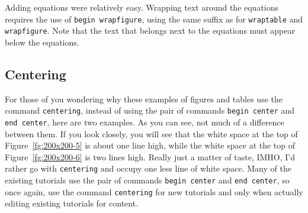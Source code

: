 Adding equations were relatively easy.  Wrapping text around the equations requires the use of \texttt{begin wrapfigure}, using the same suffix as for \texttt{wraptable} and \texttt{wrapfigure}.  Note that the text that belongs next to the equations must appear below the equations.\\

\subsection*{Centering}

For those of you wondering why these examples of figures and tables use the command \texttt{centering}, instead of using the pair of commands \texttt{begin center} and \texttt{end center}, here are two examples.  As you can see, not much of a difference between them.  If you look closely, you will see that the white space at the top of Figure~\ref{fg:200x200-5} is about one line high, while the white space at the top of Figure~\ref{fg:200x200-6} is two lines high.  Really just a matter of taste, IMHO, I'd rather go with \texttt{centering} and occupy one less line of white space.  Many of the existing tutorials use the pair of commands \texttt{begin center} and \texttt{end center}, so once again, use the command \texttt{centering} for new tutorials and only when actually editing existing tutorials for content.

